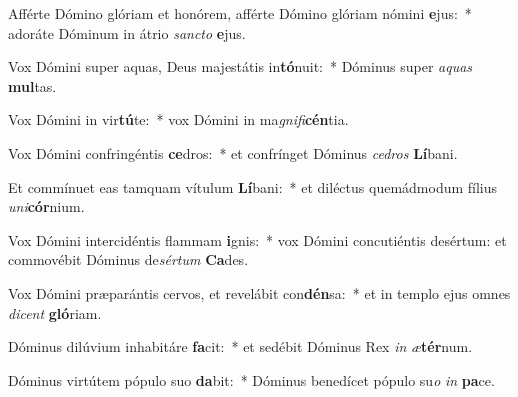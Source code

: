 \item Afférte Dómino glóriam et honórem, afférte Dómino glóriam nómini \textbf{e}jus:~* adoráte Dóminum in átrio \textit{sanc}\textit{to} \textbf{e}jus.
\item Vox Dómini super aquas, Deus majestátis in\textbf{tó}nuit:~* Dóminus super \textit{a}\textit{quas} \textbf{mul}tas.
\item Vox Dómini in vir\textbf{tú}te:~* vox Dómini in ma\textit{gni}\textit{fi}\textbf{cén}tia.
\item Vox Dómini confringéntis \textbf{ce}dros:~* et confrínget Dóminus \textit{ce}\textit{dros} \textbf{Lí}bani.
\item Et commínuet eas tamquam vítulum \textbf{Lí}bani:~* et diléctus quemádmodum fílius \textit{u}\textit{ni}\textbf{cór}nium.
\item Vox Dómini intercidéntis flammam \textbf{i}gnis:~* vox Dómini concutiéntis desértum: et commovébit Dóminus de\textit{sér}\textit{tum} \textbf{Ca}des.
\item Vox Dómini præparántis cervos, et revelábit con\textbf{dén}sa:~* et in templo ejus omnes \textit{di}\textit{cent} \textbf{gló}riam.
\item Dóminus dilúvium inhabitáre \textbf{fa}cit:~* et sedébit Dóminus Rex \textit{in} \textit{æ}\textbf{tér}num.
\item Dóminus virtútem pópulo suo \textbf{da}bit:~* Dóminus benedícet pópulo su\textit{o} \textit{in} \textbf{pa}ce.
